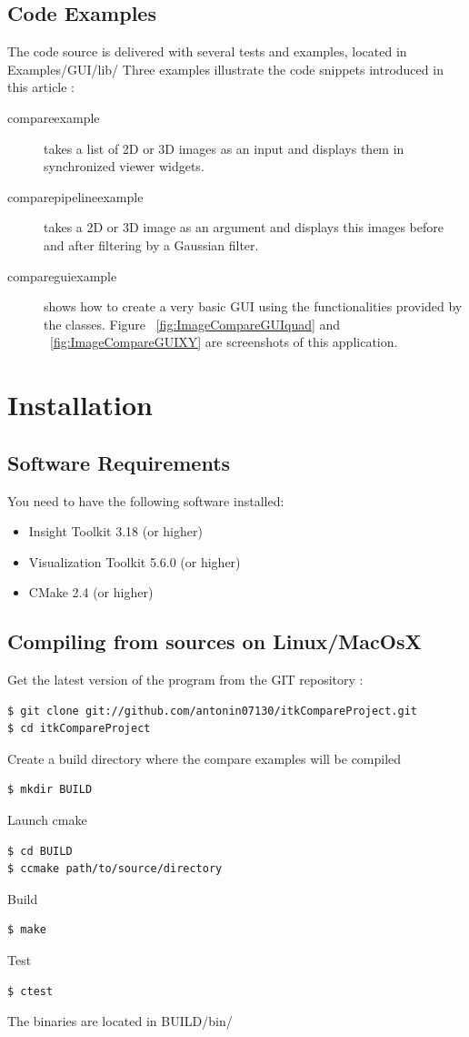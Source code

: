 \documentclass{InsightArticle}
\begin{document}
\subsection*{Code Examples}
The code source is delivered with several tests and examples, located in Examples/GUI/lib/
Three examples illustrate the code snippets introduced in this article :
\begin{description}
  \item [compareexample] takes a list of 2D or 3D images as an input and displays them in synchronized viewer widgets.
  \item [comparepipelineexample] takes a 2D or 3D image as an argument and displays this images before and after filtering by a Gaussian filter. 
  \item [compareguiexample] shows how to create a very basic GUI using the functionalities provided by the  classes. Figure ~\ref{fig:ImageCompareGUIquad} and ~\ref{fig:ImageCompareGUIXY} are screenshots of this application.
\end{description}


\section{Installation}
\subsection*{Software Requirements}
You need to have the following software installed:
\begin{itemize}
  \item  Insight Toolkit 3.18 (or higher)
  \item  Visualization Toolkit 5.6.0 (or higher)
  \item  CMake 2.4 (or higher)
\end{itemize}

\subsection*{Compiling from sources on Linux/MacOsX}
Get the latest version of the program from the GIT repository :
\begin{lstlisting}[language=ksh,numbers=none,captionpos=none]
$ git clone git://github.com/antonin07130/itkCompareProject.git 
$ cd itkCompareProject
\end{lstlisting}
Create a build directory where the compare examples will be compiled
\begin{lstlisting}[language=ksh,numbers=none,captionpos=none]
$ mkdir BUILD
\end{lstlisting}
Launch cmake
\begin{lstlisting}[language=ksh,numbers=none,captionpos=none]
$ cd BUILD
$ ccmake path/to/source/directory
\end{lstlisting}
Build
\begin{lstlisting}[language=ksh,numbers=none,captionpos=none]
$ make
\end{lstlisting}
Test
\begin{lstlisting}[language=ksh,numbers=none,captionpos=none]
$ ctest
\end{lstlisting}
The binaries are located in BUILD/bin/ 
\end{document}
